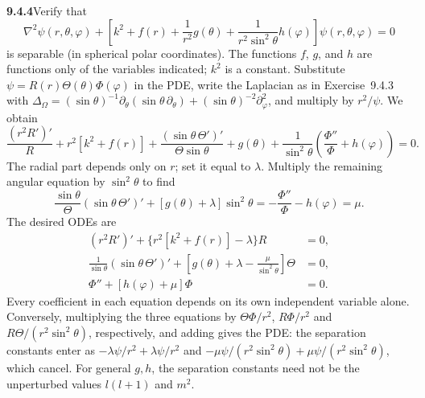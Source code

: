 \par\bigskip
\noindent\textbf{9.4.4}\quad Verify that
\[
\nabla^{2}\psi(r,\theta,\varphi)+
\left[k^{2}+f(r)+\frac{1}{r^{2}}g(\theta)
+\frac{1}{r^{2}\sin^{2}\theta}h(\varphi)\right]\psi(r,\theta,\varphi)=0
\]
is separable (in spherical polar coordinates). The functions $f$, $g$, and $h$
are functions only of the variables indicated; $k^{2}$ is a constant.
\solution
Substitute $\psi=R(r)\Theta(\theta)\Phi(\varphi)$ in the PDE, write the
Laplacian as in Exercise~9.4.3 with
$\Delta_\Omega=(\sin\theta)^{-1}\partial_\theta(\sin\theta\,\partial_\theta)
+(\sin\theta)^{-2}\partial_\varphi^2$, and multiply by $r^2/\psi$.
We obtain
\[
\frac{(r^2R')'}R+r^2[k^2+f(r)]
+\frac{(\sin\theta\,\Theta')'}{\Theta\sin\theta}+g(\theta)
+\frac1{\sin^2\theta}
 \left(\frac{\Phi''}{\Phi}+h(\varphi)\right)=0.
\]
The radial part depends only on $r$; set it equal to $\lambda$.
Multiply the remaining angular equation by $\sin^2\theta$ to find
\[
\frac{\sin\theta}{\Theta}(\sin\theta\,\Theta')'
+[g(\theta)+\lambda]\sin^2\theta
=-\frac{\Phi''}{\Phi}-h(\varphi)=\mu.
\]
The desired ODEs are
\[
\boxed{\begin{aligned}
(r^2R')'+\{r^2[k^2+f(r)]-\lambda\}R&=0,\\
\frac1{\sin\theta}(\sin\theta\,\Theta')'
 +\left[g(\theta)+\lambda-\frac\mu{\sin^2\theta}\right]\Theta&=0,\\
\Phi''+[h(\varphi)+\mu]\Phi&=0.
\end{aligned}}
\]
Every coefficient in each equation depends on its own independent
variable alone.  Conversely, multiplying the three equations by
$\Theta\Phi/r^2$, $R\Phi/r^2$ and $R\Theta/(r^2\sin^2\theta)$,
respectively, and adding gives the PDE: the separation constants enter
as $-\lambda\psi/r^2+\lambda\psi/r^2$ and
$-\mu\psi/(r^2\sin^2\theta)+\mu\psi/(r^2\sin^2\theta)$, which cancel.
For general $g,h$,
the separation constants need not be the unperturbed values $l(l+1)$
and $m^2$.


